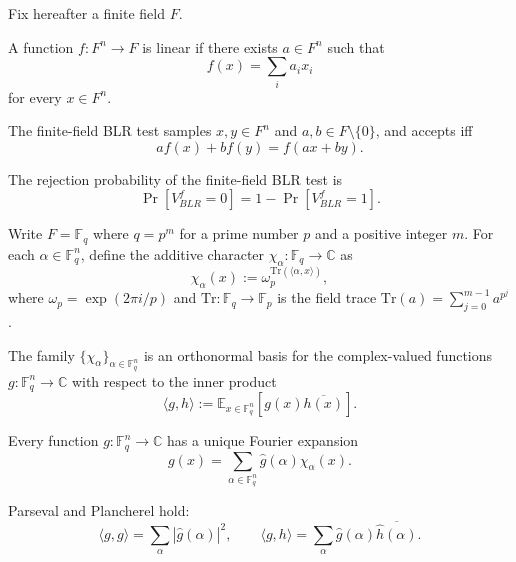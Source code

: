Fix hereafter a finite field $F$.

\begin{definition}
    \label{def:ff-linear}
    A function $f : F^n \to F$ is linear if there exists
    $a \in F^n$ such that
    \[
        f(x) = \sum_i a_i x_i
    \]
    for every $x \in F^n$.
\end{definition}

\begin{definition}
    \label{def:ff-blr-test}
    The finite-field BLR test samples $x,y \in F^n$ and
  $a,b \in F \setminus \{0\}$, and accepts iff
  \[
    a f(x) + b f(y) = f(ax + by).
  \]
\end{definition}

\begin{definition}
    \label{def:ff-blr-reject-prob}
    The rejection probability of the finite-field BLR test is
  \[
    \Pr[V_{BLR}^f = 0] = 1 - \Pr[V_{BLR}^f = 1].
  \]
\end{definition}

\begin{definition}
    \label{def:ff-additive-characters}
    Write $F=\mathbb{F}_q$ where $q = p^m$ for a prime number $p$ and a positive integer $m$. For each $\alpha \in \mathbb{F}_q^n$, define
  the additive character $\chi_\alpha : \mathbb{F}_q \rightarrow \mathbb{C}$ as
  \[
    \chi_\alpha(x) := \omega_p^{\mathrm{Tr}(\langle \alpha, x\rangle)},
  \]
  where $ \omega_p = \exp(2π i/p)$ and  $\mathrm{Tr} : \mathbb{F}_q \to \mathbb{F}_p $ is the field trace $\mathrm{Tr}(a) = \sum_{j=0}^{m-1} a^{p^j}$.
\end{definition}

\begin{lemma}
    \label{lem:ff-characters-orthonormal}
The family $\{\chi_\alpha\}_{\alpha \in \mathbb{F}_q^n}$ is an
  orthonormal basis for the complex-valued functions
  $g : \mathbb{F}_q^n \to \mathbb{C}$ with respect to the inner product
  \[
    \langle g,h\rangle := \mathbb{E}_{x \in \mathbb{F}_q^n}[g(x)\overline{h(x)}].
  \]
\end{lemma}

\begin{lemma}
    \label{lem:ff-fourier-expansion}
Every function $g : \mathbb{F}_q^n \to \mathbb{C}$ has a unique
  Fourier expansion
  \[
    g(x) = \sum_{\alpha \in \mathbb{F}_q^n} \widehat g(\alpha)\chi_\alpha(x).
  \]
\end{lemma}

\begin{lemma}
    \label{lem:ff-parseval-plancherel}
    Parseval and Plancherel hold:
  \[
    \langle g,g\rangle = \sum_\alpha |\widehat g(\alpha)|^2,
    \qquad
    \langle g,h\rangle = \sum_\alpha \widehat g(\alpha)\overline{\widehat h(\alpha)}.
  \]
\end{lemma}

